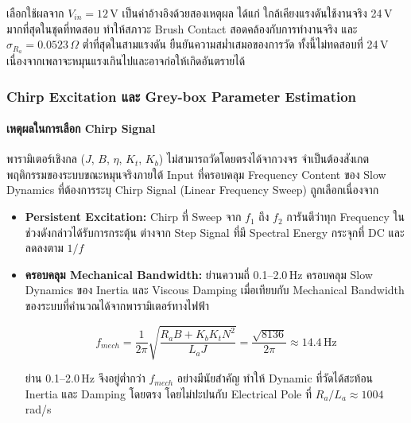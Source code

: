 เลือกใช้ผลจาก $V_{in} = 12$\,V เป็นค่าอ้างอิงด้วยสองเหตุผล ได้แก่
ใกล้เคียงแรงดันใช้งานจริง 24\,V มากที่สุดในชุดที่ทดสอบ
ทำให้สภาวะ Brush Contact สอดคล้องกับการทำงานจริง
และ $\sigma_{R_a} = 0.0523\,\Omega$ ต่ำที่สุดในสามแรงดัน
ยืนยันความสม่ำเสมอของการวัด
ทั้งนี้ไม่ทดสอบที่ 24\,V เนื่องจากเพลาจะหมุนแรงเกินไปและอาจก่อให้เกิดอันตรายได้

\subsubsection{Chirp Excitation และ Grey-box Parameter Estimation}

\paragraph{เหตุผลในการเลือก Chirp Signal}

พารามิเตอร์เชิงกล ($J$, $B$, $\eta$, $K_t$, $K_b$)
ไม่สามารถวัดโดยตรงได้จากวงจร
จำเป็นต้องสังเกตพฤติกรรมของระบบขณะหมุนจริงภายใต้ Input ที่ครอบคลุม
Frequency Content ของ Slow Dynamics ที่ต้องการระบุ
Chirp Signal (Linear Frequency Sweep) ถูกเลือกเนื่องจาก

\begin{itemize}
  \item \textbf{Persistent Excitation:}
        Chirp ที่ Sweep จาก $f_1$ ถึง $f_2$ การันตีว่าทุก Frequency
        ในช่วงดังกล่าวได้รับการกระตุ้น ต่างจาก Step Signal
        ที่มี Spectral Energy กระจุกที่ DC และลดลงตาม $1/f$
  \item \textbf{ครอบคลุม Mechanical Bandwidth:}
        ย่านความถี่ 0.1--2.0\,Hz ครอบคลุม Slow Dynamics ของ Inertia
        และ Viscous Damping เมื่อเทียบกับ Mechanical Bandwidth
        ของระบบที่คำนวณได้จากพารามิเตอร์ทางไฟฟ้า

        \begin{equation}
            f_{mech} = \frac{1}{2\pi}
                       \sqrt{\frac{R_a B + K_b K_t N^2}{L_a J}}
                     = \frac{\sqrt{8136}}{2\pi}
                     \approx 14.4\,\text{Hz}
            \label{eq:f_mech}
        \end{equation}

        ย่าน 0.1--2.0\,Hz จึงอยู่ต่ำกว่า $f_{mech}$ อย่างมีนัยสำคัญ
        ทำให้ Dynamic ที่วัดได้สะท้อน Inertia และ Damping โดยตรง
        โดยไม่ปะปนกับ Electrical Pole ที่ $R_a/L_a \approx 1004$\,rad/s
\end{itemize}

